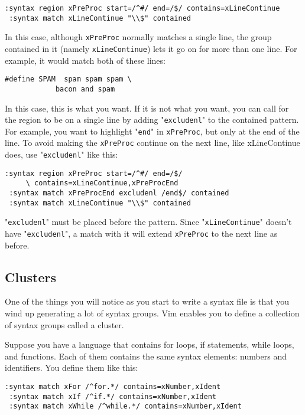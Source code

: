 \begin{Verbatim}[samepage=true]
 :syntax region xPreProc start=/^#/ end=/$/ contains=xLineContinue
 :syntax match xLineContinue "\\$" contained
\end{Verbatim}

In this case, although \verb!xPreProc! normally matches a single line, the group contained in it (namely \verb!xLineContinue!) lets it go on for more than one line.
For example, it would match both of these lines:

\begin{Verbatim}[samepage=true]
    #define SPAM  spam spam spam \ 
            bacon and spam 
\end{Verbatim}

In this case, this is what you want.
If it is not what you want, you can call for the region to be on a single line by adding "\verb!excludenl!" to the contained pattern.
For example, you want to highlight "\verb!end!" in \verb!xPreProc!, but only at the end of the line.
To avoid making the \verb!xPreProc! continue on the next line, like xLineContinue does, use "\verb!excludenl!" like this:

\begin{Verbatim}[samepage=true]
 :syntax region xPreProc start=/^#/ end=/$/
     \ contains=xLineContinue,xPreProcEnd
 :syntax match xPreProcEnd excludenl /end$/ contained
 :syntax match xLineContinue "\\$" contained
\end{Verbatim}

"\verb!excludenl!" must be placed before the pattern.
Since "\verb!xLineContinue!" doesn't have "\verb!excludenl!", a match with it will extend \verb!xPreProc! to the next line as before.
\subsection{Clusters}
\label{Clusters}
One of the things you will notice as you start to write a syntax file is that you wind up generating a lot of syntax groups.
Vim enables you to define a collection of syntax groups called a cluster.

Suppose you have a language that contains for loops, if statements, while loops, and functions.
Each of them contains the same syntax elements: numbers and identifiers.
You define them like this:

\begin{Verbatim}[samepage=true]
 :syntax match xFor /^for.*/ contains=xNumber,xIdent
 :syntax match xIf /^if.*/ contains=xNumber,xIdent
 :syntax match xWhile /^while.*/ contains=xNumber,xIdent
\end{Verbatim}

